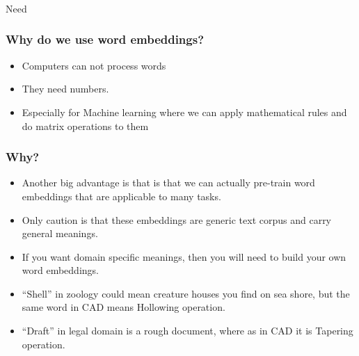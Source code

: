 \begin{frame}[fragile]\frametitle{}

\begin{center}
{\Large Need}
\end{center}
\end{frame}

\begin{frame}[fragile]\frametitle{Why do we use word embeddings?}
  \begin{itemize}
    \item Computers can not process words
	\item They need numbers.
	\item Especially for Machine learning where we can apply mathematical rules and do matrix operations to them
  \end{itemize}


\end{frame}

\begin{frame}[fragile]\frametitle{Why?}
  \begin{itemize}
    \item Another big advantage is that  is that we can actually pre-train word embeddings that are applicable to many tasks. 
	\item Only caution is that these embeddings are generic text corpus and carry general meanings.
	\item If you want domain specific meanings, then you will need to build your own word embeddings.
	\item ``Shell'' in zoology could mean creature houses you find on sea shore, but the same word in CAD means Hollowing operation.
	\item ``Draft'' in legal domain is a rough document, where as in CAD it is Tapering operation.
  \end{itemize}



\end{frame}



